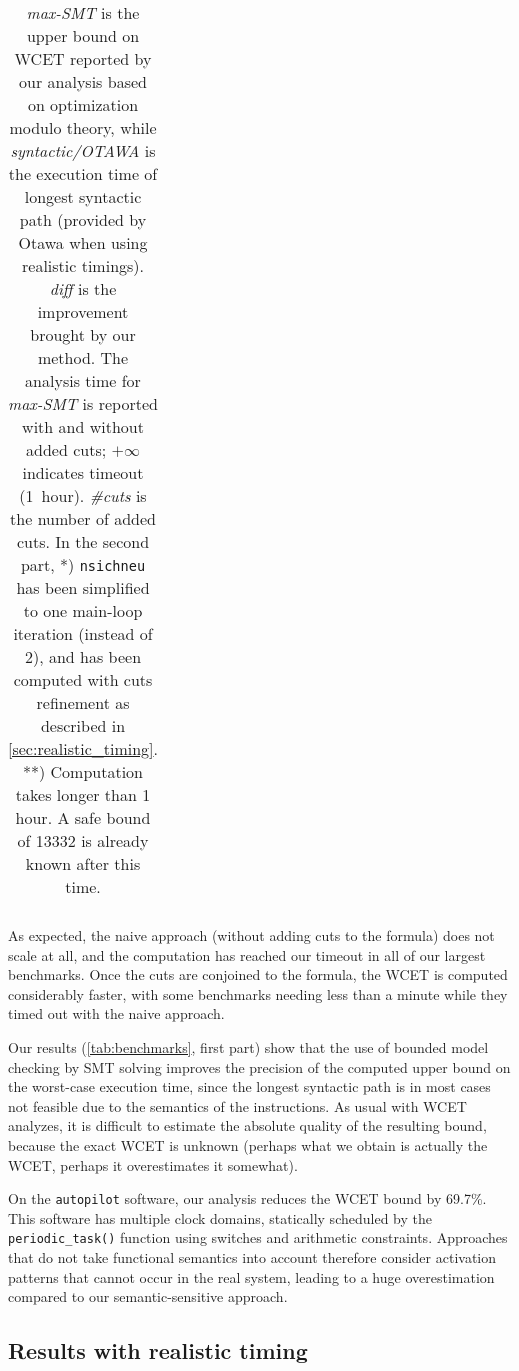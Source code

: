 \documentclass[a4paper,twocolumn,11pt]{article}
\begin{document}
\begin{table*}
\begin{tabular}{|l|r|r|r|r|r|r|}
\end{tabular}
\caption{\emph{max-SMT} is the upper bound on WCET reported by our analysis based on optimization modulo theory, while \emph{syntactic/OTAWA} is the execution time of longest syntactic path (provided by Otawa when using realistic timings). 
\emph{diff} is the improvement brought by our method. The analysis time for \emph{max-SMT} is reported with and without added cuts; $+\infty$ indicates timeout (1~hour). 
\emph{\#cuts} is the number of added cuts. In the second part, *) \texttt{nsichneu} has been simplified to one main-loop iteration (instead of 2), and has been computed with cuts refinement as described in \autoref{sec:realistic_timing}. **) Computation takes longer than 1 hour. A safe bound of 13332 is already known after this time.
}
\label{tab:benchmarks}
\end{table*}

As expected, the naive approach (without adding cuts to the formula) does not scale at all, and the computation has reached our timeout in all of our largest benchmarks. Once the cuts are conjoined to the formula, the WCET is computed considerably faster, with some benchmarks needing less than a minute while they timed out with the naive approach.

Our results (\autoref{tab:benchmarks}, first part) show that the use of bounded model checking by SMT solving improves
the precision of the computed upper bound on the worst-case execution time,
since the longest syntactic path is in most cases not feasible due to the semantics of the instructions.
As usual with WCET analyzes, it is difficult to estimate the absolute quality of the resulting bound, because the exact WCET is unknown (perhaps what we obtain is actually the WCET, perhaps it overestimates it somewhat).

On the \texttt{autopilot} software, our analysis reduces the WCET bound by 69.7\%. This software has multiple clock domains, statically scheduled by the \verb+periodic_task()+ function using switches and arithmetic constraints. Approaches that do not take functional semantics into account therefore consider activation patterns that cannot occur in the real system, leading to a huge overestimation compared to our semantic-sensitive approach.

\subsection{Results with realistic timing}
\label{sec:realistic_timing}
\end{document}
